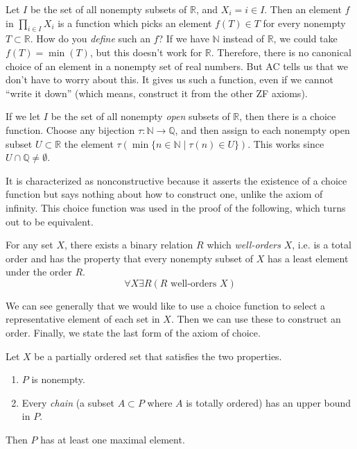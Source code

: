   \begin{example}
    Let $I$ be the set of all nonempty subsets of $\mathbb{R}$, and $X_i = i \in I$. Then an element $f$ in $\prod_{i \in I} X_i$ is a function which picks an element $f(T) \in T$ for every nonempty $T \subset \mathbb{R}$. How do you \textit{define} such an $f$? If we have $\mathbb{N}$ instead of $\mathbb{R}$, we could take $f(T) = \min(T)$, but this doesn't work for $\mathbb{R}$. Therefore, there is no canonical choice of an element in a nonempty set of real numbers. But AC tells us that we don't have to worry about this. It gives us such a function, even if we cannot ``write it down'' (which means, construct it from the other ZF axioms).  

    If we let $I$ be the set of all nonempty \textit{open} subsets of $\mathbb{R}$, then there is a choice function. Choose any bijection $\tau: \mathbb{N} \rightarrow \mathbb{Q}$, and then assign to each nonempty open subset $U \subset \mathbb{R}$ the element $\tau (\min\{n \in \mathbb{N} \mid \tau(n) \in U\})$. This works since $U \cap \mathbb{Q} \neq \emptyset$. 
  \end{example}

  It is characterized as nonconstructive because it asserts the existence of a choice function but says nothing about how to construct one, unlike the axiom of infinity. This choice function was used in the proof of the following, which turns out to be equivalent.  

  \begin{axiom}
    For any set $X$, there exists a binary relation $R$ which \textit{well-orders} $X$, i.e. is a total order and has the property that every nonempty subset of $X$ has a least element under the order $R$. 
    \begin{equation}
      \forall X \exists R (R \text{ well-orders } X)
    \end{equation}
  \end{axiom}

  We can see generally that we would like to use a choice function to select a representative element of each set in $X$. Then we can use these to construct an order. Finally, we state the last form of the axiom of choice. 

  \begin{axiom}
    Let $X$ be a partially ordered set that satisfies the two properties. 
    \begin{enumerate}
      \item $P$ is nonempty. 
      \item Every \textit{chain} (a subset $A \subset P$ where $A$ is totally ordered) has an upper bound in $P$. 
    \end{enumerate}
    Then $P$ has at least one maximal element. 
  \end{axiom}


